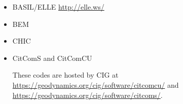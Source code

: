 \begin{itemize}
\item BASIL/ELLE \url{http://elle.ws/}

\cite{bokj08}
\cite{llor19}

\item BEM   

\cite{katl95}
\cite{moct07}
\cite{moct09}
\cite{moyb10}
\cite{qumm12}
\cite{quhm13}



\item CHIC  

\cite{norv15}

\item CitComS and CitComCU 

These codes are hosted by CIG at \url{https://geodynamics.org/cig/software/citcomcu/}
and \url{https://geodynamics.org/cig/software/citcoms/}.


\end{itemize}
